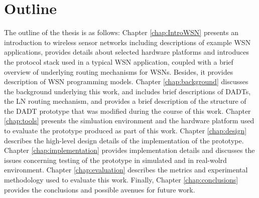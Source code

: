 \section{Outline}
The outline of the thesis is as follows: Chapter \ref{chap:IntroWSN} presents an
introduction to wireless sensor networks including descriptions of example WSN
applications, provides details about selected hardware platforms and introduces
the protocol stack used in a typical WSN application, coupled with a brief overview of
underlying routing mechanisms for WSNs. Besides, it provides description of WSN
programming models. Chapter \ref{chap:background} discusses the background
underlying this work, and includes brief descriptions of DADTs, the LN routing mechanism, and provides a brief description of the structure of the DADT prototype that was modified during the course of this work. 
Chapter \ref{chap:tools} presents the simluation
environment and the hardware platform used to evaluate the prototype produced as part of this work. 
Chapter \ref{chap:design} describes the high-level design details of the
implementation of the prototype. 
Chapter \ref{chap:implementation} provides implementation details and discusses
the issues concerning testing of the prototype in simulated and in real-wolrd
environment. 
Chapter \ref{chap:evaluation} describes the metrics and experimental methodology
used to evaluate this work.
Finally, Chapter \ref{chap:conclusions} provides the conclusions and possible avenues for future work.








